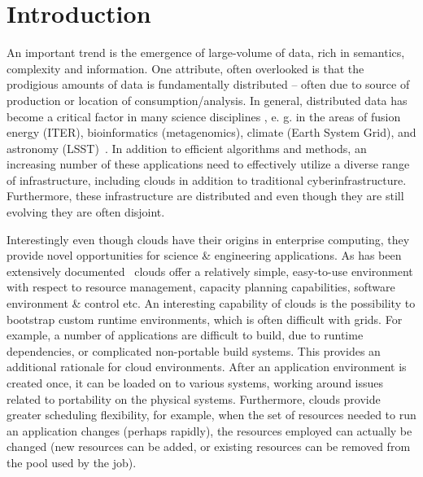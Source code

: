 \documentclass[times]{cpeauth}
\begin{document}

\maketitle


\vspace{-6pt}

\section{Introduction}
\vspace{-2pt}


An important trend is the emergence of large-volume of data, rich in
semantics, complexity and information. One attribute, often overlooked
is that the prodigious amounts of data is fundamentally distributed --
often due to source of production or location of
consumption/analysis. In general, distributed data has become a
critical factor in many science disciplines \cite{fourthparadigm},
e. g. in the areas of fusion energy (ITER), bioinformatics
(metagenomics), climate (Earth System Grid), and astronomy
(LSST)~\cite{Jha:2011fk}. In addition to efficient algorithms and
methods, an increasing number of these applications need to
effectively utilize a diverse range of infrastructure, including
clouds in addition to traditional cyberinfrastructure.  Furthermore,
these infrastructure are distributed and even though they are still
evolving they are often disjoint.


Interestingly even though clouds have their origins in enterprise
computing, they provide novel opportunities for science \& engineering
applications.  As has been extensively documented~\cite{Jha:2010kx}
clouds offer a relatively simple, easy-to-use environment with respect
to resource management, capacity planning capabilities, software
environment \& control etc.  An interesting capability of clouds is
the possibility to bootstrap custom runtime environments, which is
often difficult with grids. For example, a number of applications are
difficult to build, due to runtime dependencies, or complicated
non-portable build systems. This provides an additional rationale for
cloud environments. After an application environment is created once,
it can be loaded on to various systems, working around issues related
to portability on the physical systems. Furthermore, clouds provide
greater scheduling flexibility, for example, when the set of resources
needed to run an application changes (perhaps rapidly), the resources
employed can actually be changed (new resources can be added, or
existing resources can be removed from the pool used by the job).
\end{document}
